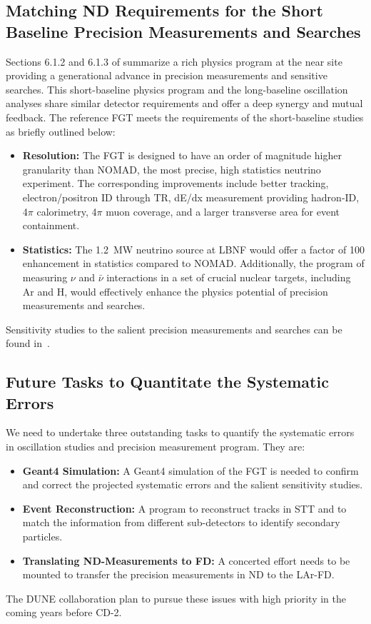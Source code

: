 \subsection{Matching ND Requirements for the Short Baseline Precision Measurements and Searches} 
\label{cdrsec:detectors-nd-ref-fgt-req-sbp}


Sections 6.1.2
and 6.1.3 of \volphys
summarize a rich physics program at the near site providing a
generational advance in precision measurements and sensitive searches.
This short-baseline physics program and the long-baseline oscillation
analyses share similar detector requirements and offer a deep synergy
and mutual feedback.  The reference FGT meets the requirements of the
short-baseline studies as briefly outlined below:
\begin{itemize}
    \item {\bf Resolution:} The FGT is designed to have an order of magnitude higher granularity than NOMAD, 
    the most precise, high statistics neutrino experiment. The corresponding improvements include better tracking, 
    electron/positron ID through TR, dE/dx measurement providing hadron-ID, 4$\pi$ calorimetry,
     4$\pi$ muon coverage, and a larger transverse area for event containment. 
    
    \item {\bf Statistics:} The 1.2~MW neutrino source at LBNF would offer a factor of 100 enhancement in statistics 
    compared to NOMAD. Additionally, the program of measuring $\nu$ and $\bar\nu$ interactions 
    in a set of crucial nuclear targets, including Ar and H, would effectively enhance the physics potential 
    of precision measurements and searches.  
\end{itemize}
Sensitivity studies to the salient precision measurements and searches can be found in~\cite{Adams:2013qkq, DPR}. 


\subsection{Future Tasks to Quantitate the Systematic Errors}
\label{cdrsec:detectors-nd-ref-fgt-req-future} 

We need to undertake three outstanding tasks to quantify the systematic errors in oscillation studies 
and precision measurement program. They are: 
\begin{itemize}
    \item {\bf Geant4 Simulation:} A Geant4 simulation of the FGT is needed to confirm and correct 
    the projected systematic errors and  the salient sensitivity studies. 
     \item {\bf Event Reconstruction:} A program to reconstruct tracks in STT and to match the 
     information from different sub-detectors to identify secondary particles.  
     \item {\bf Translating ND-Measurements to FD:} A concerted effort needs to be mounted to transfer 
     the precision measurements in ND to the LAr-FD. 
\end{itemize}    
The DUNE collaboration plan to pursue these issues with high priority in the coming years before CD-2. 
